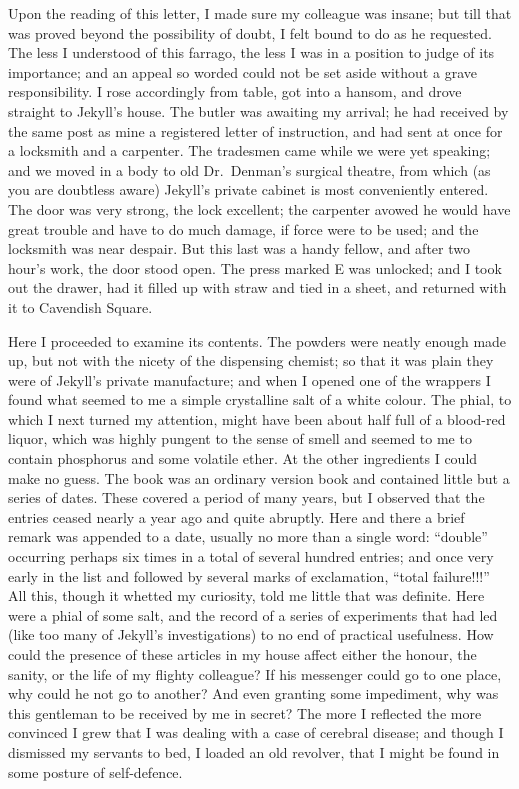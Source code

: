 \documentclass[12pt,openright]{book}
\begin{document}
Upon the reading of this letter, I made sure my colleague was insane; but till that was proved beyond the possibility of doubt, I felt bound to do as he requested. The less I understood of this farrago, the less I was in a position to judge of its importance; and an appeal so worded could not be set aside without a grave responsibility. I rose accordingly from table, got into a hansom, and drove straight to Jekyll’s house. The butler was awaiting my arrival; he had received by the same post as mine a registered letter of instruction, and had sent at once for a locksmith and a carpenter. The tradesmen came while we were yet speaking; and we moved in a body to old Dr. Denman’s surgical theatre, from which (as you are doubtless aware) Jekyll’s private cabinet is most conveniently entered. The door was very strong, the lock excellent; the carpenter avowed he would have great trouble and have to do much damage, if force were to be used; and the locksmith was near despair. But this last was a handy fellow, and after two hour’s work, the door stood open. The press marked E was unlocked; and I took out the drawer, had it filled up with straw and tied in a sheet, and returned with it to Cavendish Square.

Here I proceeded to examine its contents. The powders were neatly enough made up, but not with the nicety of the dispensing chemist; so that it was plain they were of Jekyll’s private manufacture; and when I opened one of the wrappers I found what seemed to me a simple crystalline salt of a white colour. The phial, to which I next turned my attention, might have been about half full of a blood-red liquor, which was highly pungent to the sense of smell and seemed to me to contain phosphorus and some volatile ether. At the other ingredients I could make no guess. The book was an ordinary version book and contained little but a series of dates. These covered a period of many years, but I observed that the entries ceased nearly a year ago and quite abruptly. Here and there a brief remark was appended to a date, usually no more than a single word: “double” occurring perhaps six times in a total of several hundred entries; and once very early in the list and followed by several marks of exclamation, “total failure!!!” All this, though it whetted my curiosity, told me little that was definite. Here were a phial of some salt, and the record of a series of experiments that had led (like too many of Jekyll’s investigations) to no end of practical usefulness. How could the presence of these articles in my house affect either the honour, the sanity, or the life of my flighty colleague? If his messenger could go to one place, why could he not go to another? And even granting some impediment, why was this gentleman to be received by me in secret? The more I reflected the more convinced I grew that I was dealing with a case of cerebral disease; and though I dismissed my servants to bed, I loaded an old revolver, that I might be found in some posture of self-defence.
\end{document}

